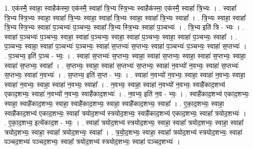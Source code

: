 \documentclass[17pt]{extarticle}
\begin{document}
1. एक॑स्मै॒ स्वाहा॒ स्वाहैक॑स्मा॒ एक॑स्मै॒ स्वाहा᳚ त्रि॒भ्य स्त्रि॒भ्यः स्वाहैक॑स्मा॒ एक॑स्मै॒ स्वाहा᳚ त्रि॒भ्यः । . स्वाहा᳚ त्रि॒भ्य स्त्रि॒भ्यः स्वाहा॒ स्वाहा᳚ त्रि॒भ्यः स्वाहा॒ स्वाहा᳚ त्रि॒भ्यः स्वाहा॒ स्वाहा᳚ त्रि॒भ्यः स्वाहा᳚ । . त्रि॒भ्यः स्वाहा॒ स्वाहा᳚ त्रि॒भ्य स्त्रि॒भ्यः स्वाहा॑ प॒ञ्चभ्यः॑ प॒ञ्चभ्यः॒ स्वाहा᳚ त्रि॒भ्य स्त्रि॒भ्यः स्वाहा॑ प॒ञ्चभ्यः॑ । . त्रि॒भ्य इति॑ त्रि - भ्यः । . स्वाहा॑ प॒ञ्चभ्यः॑ प॒ञ्चभ्यः॒ स्वाहा॒ स्वाहा॑ प॒ञ्चभ्यः॒ स्वाहा॒ स्वाहा॑ प॒ञ्चभ्यः॒ स्वाहा॒ स्वाहा॑ प॒ञ्चभ्यः॒ स्वाहा᳚ । . प॒ञ्चभ्यः॒ स्वाहा॒ स्वाहा॑ प॒ञ्चभ्यः॑ प॒ञ्चभ्यः॒ स्वाहा॑ स॒प्तभ्यः॑ स॒प्तभ्यः॒ स्वाहा॑ प॒ञ्चभ्यः॑ प॒ञ्चभ्यः॒ स्वाहा॑ स॒प्तभ्यः॑ । . प॒ञ्चभ्य॒ इति॑ प॒ञ्च - भ्यः॒ । . स्वाहा॑ स॒प्तभ्यः॑ स॒प्तभ्यः॒ स्वाहा॒ स्वाहा॑ स॒प्तभ्यः॒ स्वाहा॒ स्वाहा॑ स॒प्तभ्यः॒ स्वाहा॒ स्वाहा॑ स॒प्तभ्यः॒ स्वाहा᳚ । . स॒प्तभ्यः॒ स्वाहा॒ स्वाहा॑ स॒प्तभ्यः॑ स॒प्तभ्यः॒ स्वाहा॑ न॒वभ्यो॑ न॒वभ्यः॒ स्वाहा॑ स॒प्तभ्यः॑ स॒प्तभ्यः॒ स्वाहा॑ न॒वभ्यः॑ । . स॒प्तभ्य॒ इति॑ स॒प्त - भ्यः॒ । . स्वाहा॑ न॒वभ्यो॑ न॒वभ्यः॒ स्वाहा॒ स्वाहा॑ न॒वभ्यः॒ स्वाहा॒ स्वाहा॑ न॒वभ्यः॒ स्वाहा॒ स्वाहा॑ न॒वभ्यः॒ स्वाहा᳚ । . न॒वभ्यः॒ स्वाहा॒ स्वाहा॑ न॒वभ्यो॑ न॒वभ्यः॒ स्वाहै॑काद॒शभ्य॑ एकाद॒शभ्यः॒ स्वाहा॑ न॒वभ्यो॑ न॒वभ्यः॒ स्वाहै॑काद॒शभ्यः॑ । . न॒वभ्य॒ इति॑ न॒व - भ्यः॒ । . स्वाहै॑काद॒शभ्य॑ एकाद॒शभ्यः॒ स्वाहा॒ स्वाहै॑काद॒शभ्यः॒ स्वाहा॒ स्वाहै॑काद॒शभ्यः॒ स्वाहा॒ 
स्वाहै॑काद॒शभ्यः॒ स्वाहा᳚ । . ए॒का॒द॒शभ्यः॒ स्वाहा॒ स्वाहै॑काद॒शभ्य॑ एकाद॒शभ्यः॒ स्वाहा᳚ त्रयोद॒शभ्य॑ स्त्रयोद॒शभ्यः॒ स्वाहै॑काद॒शभ्य॑ एकाद॒शभ्यः॒ स्वाहा᳚ त्रयोद॒शभ्यः॑ । . ए॒का॒द॒शभ्य॒ इत्ये॑काद॒श - भ्यः॒ । . स्वाहा᳚ त्रयोद॒शभ्य॑ स्त्रयोद॒शभ्यः॒ स्वाहा॒ स्वाहा᳚ त्रयोद॒शभ्यः॒ स्वाहा॒ स्वाहा᳚ त्रयोद॒शभ्यः॒ स्वाहा॒ स्वाहा᳚ त्रयोद॒शभ्यः॒ स्वाहा᳚ । . त्र॒यो॒द॒शभ्यः॒ स्वाहा॒ स्वाहा᳚ त्रयोद॒शभ्य॑ स्त्रयोद॒शभ्यः॒ स्वाहा॑ पञ्चद॒शभ्यः॑ पञ्चद॒शभ्यः॒ स्वाहा᳚ त्रयोद॒शभ्य॑ स्त्रयोद॒शभ्यः॒ स्वाहा॑ पञ्चद॒शभ्यः॑ । \newline
\end{document}
